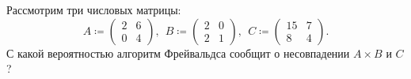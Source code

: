Рассмотрим три числовых матрицы:
$$
    A \coloneqq
    \begin{pmatrix}
      2 & 6\\
      0 & 4
    \end{pmatrix}, ~~
    B \coloneqq
    \begin{pmatrix}
      2 & 0\\
      2 & 1
    \end{pmatrix}, ~~
    C \coloneqq
    \begin{pmatrix}
      15 & 7\\
      8 & 4
    \end{pmatrix}.
$$
С какой вероятностью алгоритм Фрейвальдса сообщит о несовпадении $A \times B$ и $C$?

